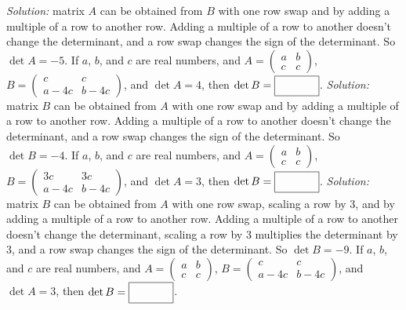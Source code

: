 \begin{parts}
        \ifnum {} {\color{DarkBlue} \textit{Solution:} matrix $A$ can be obtained from $B$ with one row swap and by adding a multiple of a row to another row. Adding a multiple of a row to another doesn't change the determinant, and a row swap changes the sign of the determinant. So $\det A = -5$. } \fi    
    \fi 
    \ifnum {}
        If $a$, $b$, and $c$ are real numbers, and $A = \begin{pmatrix} a&b\\c&c\end{pmatrix}$, $ B = \begin{pmatrix}c&c\\a-4c&b-4c \end{pmatrix}$, and $ \det A = 4$, then $\det B =  \framebox{\strut\hspace{1.2cm}}$.
        \ifnum {} {\color{DarkBlue} \textit{Solution:} matrix $B$ can be obtained from $A$ with one row swap and by adding a multiple of a row to another row. Adding a multiple of a row to another doesn't change the determinant, and a row swap changes the sign of the determinant. So $\det B = -4$. } \fi  
    \fi 
    \ifnum {}
        If $a$, $b$, and $c$ are real numbers, and $A = \begin{pmatrix} a&b\\c&c\end{pmatrix}$, $ B = \begin{pmatrix}3c&3c\\a-4c&b-4c \end{pmatrix}$, and $ \det A = 3$, then $\det B =  \framebox{\strut\hspace{1.2cm}}$.
        \ifnum {} {\color{DarkBlue} \textit{Solution:} matrix $B$ can be obtained from $A$ with one row swap, scaling a row by 3, and by adding a multiple of a row to another row. Adding a multiple of a row to another doesn't change the determinant, scaling a row by 3 multiplies the determinant by 3, and a row swap changes the sign of the determinant. So $\det B = -9$. } \fi  
    \fi 
    \ifnum {}
        If $a$, $b$, and $c$ are real numbers, and $A = \begin{pmatrix} a&b\\c&c\end{pmatrix}$, $ B = \begin{pmatrix}c&c\\a-4c&b-4c \end{pmatrix}$, and $ \det A = 3$, then $\det B =  \framebox{\strut\hspace{1.2cm}}$.

\end{parts}
